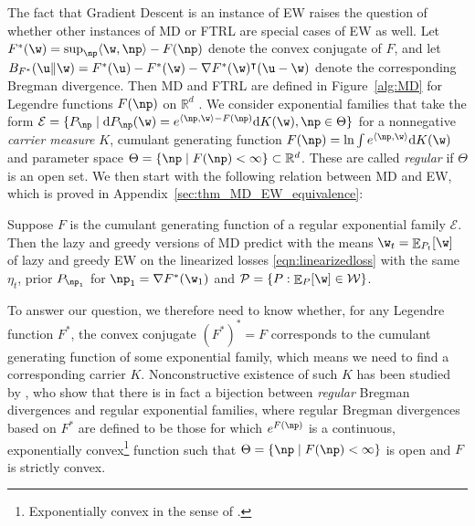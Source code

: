 \documentclass{colt2018} %
\DeclareMathOperator*{\E}{\mathbb{E}}
\renewcommand{\top}{\intercal}
\newcommand{\reals}{\mathbb{R}}
\newcommand{\domainP}{\mathcal{P}}
\newcommand{\domainw}{\mathcal{W}}
\newcommand{\Expfam}{\mathcal{E}}		%
\newcommand{\inner}[2]{\langle #1, #2 \rangle}  %
\newcommand{\der}{\mathrm{d}}                   %
\begin{document}
The fact that Gradient Descent is an instance of EW raises the question
of whether other instances of MD or
FTRL are special cases of
EW as well. Let $F^*(\w) = \sup_\np \inner{\w}{\np} - F(\np)$ denote the
convex conjugate of $F$, and let $B_{F^*}(\u\|\w) = F^*(\u) - F^*(\w) -
\nabla F^*(\w)^\top (\u - \w)$ denote the corresponding Bregman
divergence. Then MD and FTRL are defined in Figure~\ref{alg:MD} for
Legendre functions $F(\np)$ on $\reals^d$ \citep{CesaBianchiLugosi2006}.
We consider 
exponential families that take the form $\Expfam = \{P_\np \mid \der
P_\np(\w) = e^{\inner{\np}{\w}-F(\np)} \der K(\w), \np \in
\Theta\}$ for a nonnegative \emph{carrier measure} $K$, cumulant
generating function $F(\np) = \ln \int e^{\inner{\np}{\w}} \der K(\w)$
and parameter space $\Theta = \{\np \mid F(\np) < \infty\} \subset
\reals^d$. These are called \emph{regular} if $\Theta$ is an open set. We
then start with the following relation between MD and EW, which is proved in
Appendix~\ref{sec:thm_MD_EW_equivalence}:
% 
\begin{theorem}\label{thm:MDasEW}
  Suppose $F$ is the cumulant generating function of a regular
  exponential family $\Expfam$. Then the lazy and greedy versions of
  MD predict with the means $\w_t = \E_{P_t}[\w]$ of lazy
  and greedy EW on the linearized losses \eqref{eqn:linearizedloss} with
  the same $\eta_t$, prior $P_{\np_1}$ for $\np_1 = \nabla F^*(\w_1)$
  and $\domainP = \{P : \E_P[\w] \in \domainw\}$.
  \label{eq:thm_MD_EW_equivalence}
\end{theorem}
% 
To answer our question, we therefore need to know whether, for any
Legendre function $F^*$, the convex conjugate $(F^*)^* = F$
corresponds to the cumulant generating function of some exponential
family, which means we need to find a corresponding carrier $K$.
Nonconstructive existence of such $K$ has been studied by
\citet[Theorem~6]{banerjee2005}, who show that there is in fact a
bijection between \emph{regular}
Bregman divergences and regular exponential families, where
regular Bregman divergences based on $F^*$ are defined to be those for
which $e^{F(\np)}$ is a continuous, exponentially
convex\footnote{Exponentially convex in the sense of
\citet[Definition~7]{banerjee2005}.} function such
that $\Theta = \{\np \mid F(\np) < \infty\}$ is open and $F$ is strictly
convex.
\end{document}
